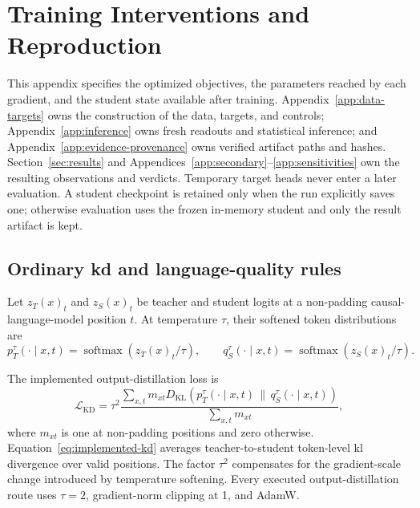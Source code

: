 \section{Training Interventions and Reproduction}
\label{app:training}

This appendix specifies the optimized objectives, the parameters reached by each gradient, and the student state available after training.
Appendix~\ref{app:data-targets} owns the construction of the data, targets, and controls; Appendix~\ref{app:inference} owns fresh readouts and statistical inference; and Appendix~\ref{app:evidence-provenance} owns verified artifact paths and hashes.
Section~\ref{sec:results} and Appendices~\ref{app:secondary}--\ref{app:sensitivities} own the resulting observations and verdicts.
Temporary target heads never enter a later evaluation.
A student checkpoint is retained only when the run explicitly saves one; otherwise evaluation uses the frozen in-memory student and only the result artifact is kept.

\subsection{Ordinary \ac{kd} and language-quality rules}

Let \(z_T(x)_t\) and \(z_S(x)_t\) be teacher and student logits at a non-padding causal-language-model position \(t\).
At temperature \(\tau\), their softened token distributions are
\[
  p_T^\tau(\cdot\mid x,t)
  =\operatorname{softmax}\!\left(z_T(x)_t/\tau\right),
  \qquad
  q_S^\tau(\cdot\mid x,t)
  =\operatorname{softmax}\!\left(z_S(x)_t/\tau\right).
\]
\begin{samepage}
The implemented output-distillation loss is
\begin{equation}
  \mathcal L_{\mathrm{KD}}
  =
  \tau^2
  \frac{
    \sum_{x,t}m_{xt}
    D_{\mathrm{KL}}\!\left(
      p_T^\tau(\cdot\mid x,t)
      \,\|\,
      q_S^\tau(\cdot\mid x,t)
    \right)
  }{
    \sum_{x,t}m_{xt}
  },
  \label{eq:implemented-kd}
\end{equation}
where \(m_{xt}\) is one at non-padding positions and zero otherwise.
Equation~\ref{eq:implemented-kd} averages teacher-to-student token-level \ac{kl} divergence over valid positions.
The factor \(\tau^2\) compensates for the gradient-scale change introduced by temperature softening.
Every executed output-distillation route uses \(\tau=2\), gradient-norm clipping at 1, and AdamW. 
\end{samepage}

